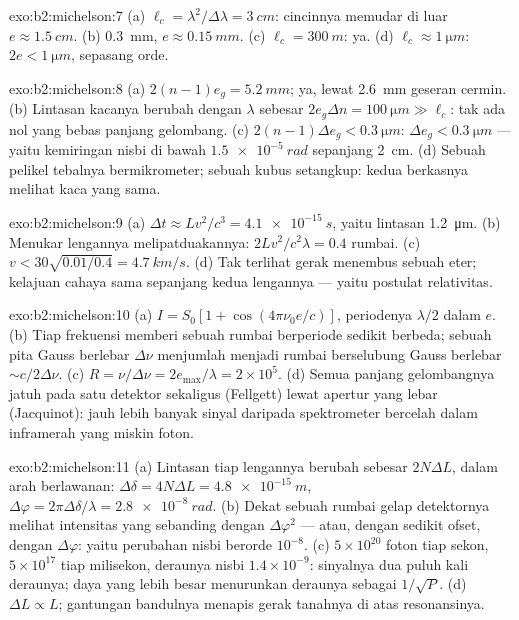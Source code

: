 \begin{solution}{exo:b2:michelson:7}
(a) $\ell_c = \lambda^2/\Delta\lambda = \qty{3}{cm}$: cincinnya memudar di luar $e \approx \qty{1.5}{cm}$. (b)
\qty{0.3}{mm}, $e \approx \qty{0.15}{mm}$. (c) $\ell_c = \qty{300}{m}$: ya. (d) $\ell_c \approx \qty{1}{\micro m}$:
$2e < \qty{1}{\micro m}$, sepasang orde.
\end{solution}

\begin{solution}{exo:b2:michelson:8}
(a) $2(n - 1)e_g = \qty{5.2}{mm}$; ya, lewat \qty{2.6}{mm} geseran cermin. (b) Lintasan
kacanya berubah dengan $\lambda$ sebesar $2e_g\Delta n = \qty{100}{\micro m} \gg \ell_c$: tak ada
nol yang bebas panjang gelombang. (c) $2(n - 1)\Delta e_g < \qty{0.3}{\micro m}$: $\Delta e_g <
\qty{0.3}{\micro m}$ --- yaitu kemiringan nisbi di bawah $\qty{1.5e-5}{rad}$ sepanjang \qty{2}{cm}. (d) Sebuah
pelikel tebalnya bermikrometer; sebuah kubus setangkup: kedua berkasnya melihat
kaca yang sama.
\end{solution}

\begin{solution}{exo:b2:michelson:9}
(a) $\Delta t \approx Lv^2/c^3 = \qty{4.1e-15}{s}$, yaitu lintasan \qty{1.2}{\micro m}. (b) Menukar
lengannya melipatduakannya: $2Lv^2/c^2\lambda = 0.4$ rumbai. (c) $v < 30\sqrt{0.01/0.4} =
\qty{4.7}{km/s}$. (d) Tak terlihat gerak menembus sebuah eter; kelajuan cahaya
sama sepanjang kedua lengannya --- yaitu postulat relativitas.
\end{solution}

\begin{solution}{exo:b2:michelson:10}
(a) $I = S_0[1 + \cos(4\pi\nu_0e/c)]$, periodenya $\lambda/2$ dalam $e$. (b) Tiap frekuensi
memberi sebuah rumbai berperiode sedikit berbeda; sebuah pita Gauss berlebar
$\Delta\nu$ menjumlah menjadi rumbai berselubung Gauss berlebar $\sim c/2\Delta\nu$.
(c) $R = \nu/\Delta\nu = 2e_{\max}/\lambda = 2 \times 10^5$. (d) Semua panjang gelombangnya jatuh pada
satu detektor sekaligus (Fellgett) lewat apertur yang lebar (Jacquinot):
jauh lebih banyak sinyal daripada spektrometer bercelah dalam inframerah
yang miskin foton.
\end{solution}

\begin{solution}{exo:b2:michelson:11}
(a) Lintasan tiap lengannya berubah sebesar $2N\Delta L$, dalam arah berlawanan: $\Delta\delta = 4N\Delta L
= \qty{4.8e-15}{m}$, $\Delta\varphi = 2\pi\Delta\delta/\lambda = \qty{2.8e-8}{rad}$. (b) Dekat sebuah rumbai
gelap detektornya melihat intensitas yang sebanding dengan $\Delta\varphi^2$ --- atau,
dengan sedikit ofset, dengan $\Delta\varphi$: yaitu perubahan nisbi berorde $10^{-8}$. (c)
$5 \times 10^{20}$ foton tiap sekon, $5 \times 10^{17}$ tiap milisekon, deraunya
nisbi $1.4 \times 10^{-9}$: sinyalnya dua puluh kali deraunya; daya yang lebih besar
menurunkan deraunya sebagai $1/\sqrt P$. (d) $\Delta L \propto L$; gantungan bandulnya
menapis gerak tanahnya di atas resonansinya.
\end{solution}


